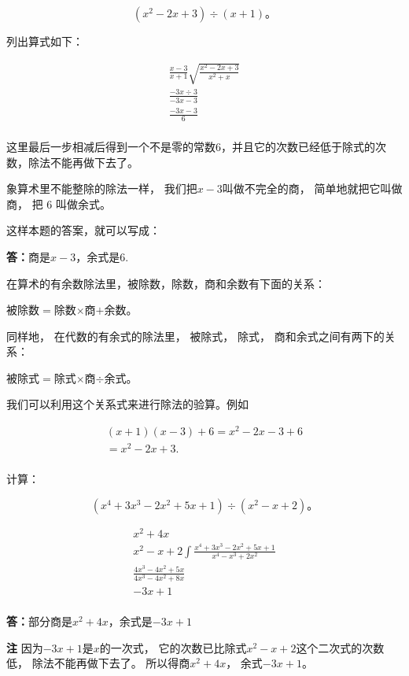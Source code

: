 \[
(x ^{2} - 2 x + 3) \div (x + 1)\text{。}
\]

列出算式如下：

\[
\begin{array}{l} \frac{x - 3}{x + 1} \sqrt {\frac{x ^{2} - 2 x + 3}{x ^{2} + x}} \\ \frac{- 3 x \div 3}{- 3 x - 3} \\ \frac{- 3 x - 3}{6} \\ \end{array}
\]

这里最后一步相减后得到一个不是零的常数6，并且它的次数已经低于除式的次数，除法不能再做下去了。

象算术里不能整除的除法一样， 我们把\(x - 3\)叫做不完全的商，
简单地就把它叫做商， 把 6 叫做余式。

这样本题的答案，就可以写成：

\textbf{答：}商是\(x - 3\)，余式是6.

在算术的有余数除法里，被除数，除数，商和余数有下面的关系：

被除数\(=\)除数\(\times\)商\(+\)余数。

同样地， 在代数的有余式的除法里， 被除式， 除式，
商和余式之间有两下的关系：

被除式\(=\)除式\(\times\)商\(\div\)余式。

我们可以利用这个关系式来进行除法的验算。例如

\[
\begin{array}{l} (x + 1) (x - 3) + 6 = x ^{2} - 2 x - 3 + 6 \\ = x ^{2} - 2 x + 3. \\ \end{array}
\]

 计算：

\[
(x ^{4} + 3 x ^{3} - 2 x ^{2} + 5 x + 1) \div (x ^{2} - x + 2)\text{。}
\]


\[
\begin{array}{l} x ^{2} + 4 x \\ x ^{2} - x + 2 \int \frac{x ^{4} + 3 x ^{3} - 2 x ^{2} + 5 x + 1}{x ^{4} - x ^{3} + 2 x ^{2}} \\ \frac{4 x ^{3} - 4 x ^{2} + 5 x}{4 x ^{3} - 4 x ^{2} + 8 x} \\ - 3 x + 1 \\ \end{array}
\]

\textbf{答：}部分商是\(x^{2} + 4x\)，余式是\(-3x + 1\)

\textbf{注} 因为\(-3x + 1\)是\(x\)的一次式，
它的次数已比除式\(x^{2} - x + 2\)这个二次式的次数低，
除法不能再做下去了。 所以得商\(x^{2} + 4x\)， 余式\(-3x + 1\)。

